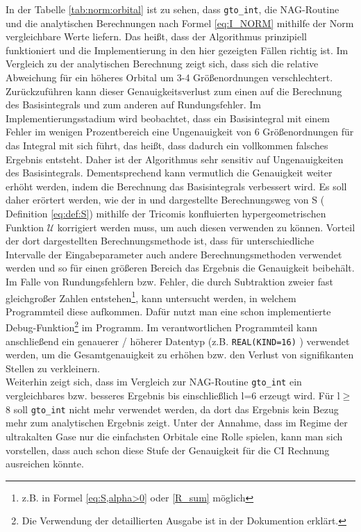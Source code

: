 In der Tabelle \ref{tab:norm:orbital} ist zu sehen, dass \texttt{gto\_int}, die 
NAG-Routine und die analytischen 
Berechnungen nach Formel \ref{eq:I_NORM} mithilfe der Norm vergleichbare Werte 
liefern. Das heißt, dass der Algorithmus prinzipiell funktioniert und die 
Implementierung in den hier gezeigten Fällen richtig ist. Im Vergleich zu der 
analytischen Berechnung zeigt sich, dass sich die relative Abweichung für ein 
höheres Orbital um 3-4 Größenordnungen verschlechtert. Zurückzuführen kann 
dieser Genauigkeitsverlust zum einen auf die Berechnung des Basisintegrals und 
zum anderen auf Rundungsfehler. Im Implementierungsstadium wird beobachtet, 
dass ein Basisintegral mit einem Fehler im wenigen Prozentbereich eine 
Ungenauigkeit von 6 Größenordnungen für das Integral mit sich führt, das heißt, 
dass dadurch
ein vollkommen falsches Ergebnis entsteht. Daher ist der Algorithmus sehr 
sensitiv auf Ungenauigkeiten des Basisintegrals. Dementsprechend kann 
vermutlich die Genauigkeit weiter erhöht werden, indem die Berechnung das 
Basisintegrals verbessert wird. Es soll daher erörtert werden, wie der in 
\cite{av:1a} und \cite{av:1a2} dargestellte Berechnungsweg von S ( Definition 
\ref{eq:def:S}) mithilfe der Tricomis konfluierten hypergeometrischen Funktion 
$\mathcal{U}$ korrigiert werden muss, um auch diesen verwenden zu können. 
Vorteil der dort dargestellten Berechnungsmethode ist, dass für 
unterschiedliche 
Intervalle der Eingabeparameter auch andere Berechnungsmethoden verwendet 
werden und so für 
einen größeren Bereich das Ergebnis die Genauigkeit beibehält. Im 
Falle von Rundungsfehlern bzw. Fehler, die durch 
Subtraktion zweier fast gleichgroßer Zahlen 
entstehen\footnote{z.B. in Formel \ref{eq:S,alpha>0} oder \ref{R_sum}
möglich}, 
kann untersucht werden, in welchem Programmteil diese 
aufkommen. Dafür nutzt man 
eine schon implementierte Debug-Funktion\footnote{Die Verwendung der 
detaillierten Ausgabe ist in der Dokumention erklärt.} im Programm. Im 
verantwortlichen Programmteil kann anschließend ein genauerer / 
höherer Datentyp (z.B. \texttt{REAL(KIND=16)} ) verwendet werden, um die 
Gesamtgenauigkeit zu erhöhen bzw. den Verlust von 
signifikanten Stellen zu verkleinern.\\

Weiterhin zeigt sich, dass im Vergleich zur NAG-Routine \texttt{gto\_int} ein 
vergleichbares bzw. besseres Ergebnis bis einschließlich l=6 erzeugt wird. Für 
l$\geq$8 soll \texttt{gto\_int} nicht mehr verwendet werden, 
da dort das Ergebnis kein Bezug mehr zum analytischen 
Ergebnis zeigt. Unter der Annahme, dass 
im Regime der ultrakalten Gase nur die einfachsten 
Orbitale eine Rolle spielen, 
kann man sich vorstellen, dass auch schon diese Stufe 
der Genauigkeit für die CI Rechnung 
ausreichen könnte. 

